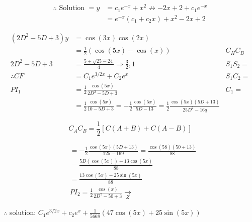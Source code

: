 \documentclass[12pt, a4paper]{article}
\begin{document}
$$
\begin{aligned}
	\therefore \text{ Solution }=y & =c_{1} e^{-x}+x^2 \nrightarrow-2 x+2+c_{1} e^{-x} \\
	                               & =e^{-x}\left(c_{1}+c_{2} x\right)+x^2 -2 x+2
\end{aligned}
$$

$$
\begin{array}{rlr}
	\left(2 D^{2}-5 D+3\right) y & =\cos(3 x) \cos(2 x)                                                                                                              &              \\
	                             & =\frac{1}{2}(\cos(5 x)-\cos(x))                                                                                                   & C_{H} C_{B}  \\
	2 D^{2}-5 D+3                & =\frac{5 \pm \sqrt{25-24}}{4} \Rightarrow \frac{3}{2}, 1                                                                          & S_{1} S_{2}= \\
	\therefore C F               & =C_{1} e^{3 / 2 x}+C_{2} e^{x}                                                                                                    & S_{1} C_{2}= \\
	P I_{1}                      & =\frac{1}{2} \frac{\cos(5 x)}{2 D^{2}-5 D+3}                                                                                      & C_{1}=       \\
	                             & =\frac{1}{2} \frac{\cos(5 x)}{10-5 D+3}=-\frac{1}{2} \frac{\cos(5 x)}{5 D-13}=\frac{1}{2} \frac{\cos(5 x)(5 D+13)}{25 D^{2}-16 q}
\end{array}
$$

$$
C_{A} C_{B}=\frac{1}{2}[C(A+B)+C(A-B)]
$$

$$
\begin{aligned}
	 & =-\frac{1}{2} \frac{\cos(5 x)(5 D+13)}{125-169}=\frac{\cos(58)(50+13)}{88} \\
	 & =\frac{5 D(\cos(5 x))+13 \cos(5 x)}{88}                                    \\
	 & =\frac{13 \cos(5 x)-25 \sin(5 x)}{88}                                      \\
	 & P I_{2}=\frac{1}{2} \frac{\cos(x)}{2 D^{2}-50+3} \xrightarrow[Z]{ }
\end{aligned}
$$

$\therefore$ solution: $C_{1} e^{3 / 2 x}+c_{2} e^{x}+\frac{1}{5668}(47 \cos(5 x)+25 \sin(5 x))$
\end{document}
